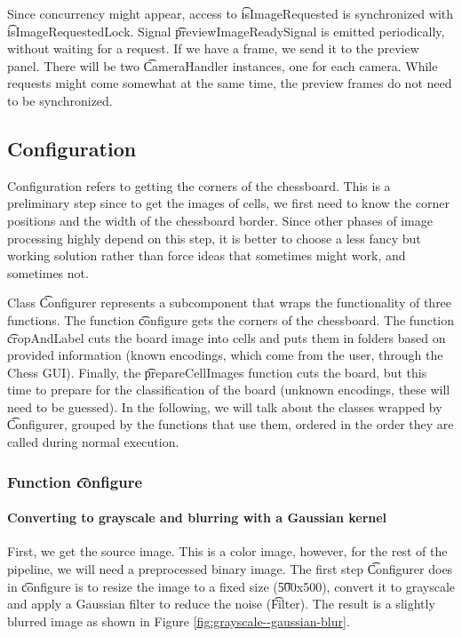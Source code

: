 Since concurrency might appear, access to \t{isImageRequested} is synchronized with \t{isImageRequestedLock}. Signal \t{previewImageReadySignal} is emitted periodically, without waiting for a request. If we have a frame, we send it to the preview panel. There will be two \t{CameraHandler} instances, one for each camera. While requests might come somewhat at the same time, the preview frames do not need to be synchronized.



\subsection{Configuration}

Configuration refers to getting the corners of the chessboard. This is a preliminary step since to get the images of cells, we first need to know the corner positions and the width of the chessboard border. Since other phases of image processing highly depend on this step, it is better to choose a less fancy but working solution rather than force ideas that sometimes might work, and sometimes not.

Class \t{Configurer} represents a subcomponent that wraps the functionality of three functions. The function \t{configure} gets the corners of the chessboard. The function \t{cropAndLabel} cuts the board image into cells and puts them in folders based on provided information (known encodings, which come from the user, through the Chess GUI). Finally, the \t{prepareCellImages} function cuts the board, but this time to prepare for the classification of the board (unknown encodings, these will need to be guessed). In the following, we will talk about the classes wrapped by \t{Configurer}, grouped by the functions that use them, ordered in the order they are called during normal execution.


\subsubsection{Function \t{configure}}
\paragraph{Converting to grayscale and blurring with a Gaussian kernel}

First, we get the source image. This is a color image, however, for the rest of the pipeline, we will need a preprocessed binary image. The first step \t{Configurer} does in \t{configure} is to resize the image to a fixed size (\t{500x500}), convert it to grayscale and apply a Gaussian filter to reduce the noise (\t{Filter}). The result is a slightly blurred image as shown in Figure \ref{fig:grayscale--gaussian-blur}.

